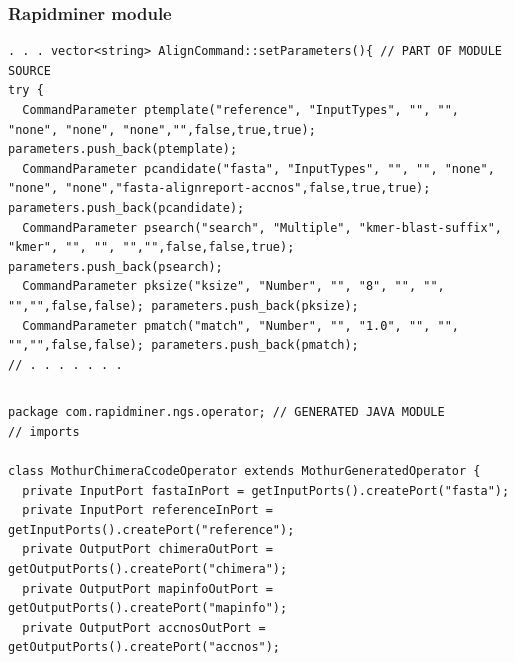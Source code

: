 \documentclass[10pt]{beamer}
\begin{document}
\begin{frame}[fragile]
  \frametitle{Rapidminer module}
\begin{verbatim}
. . . vector<string> AlignCommand::setParameters(){ // PART OF MODULE SOURCE
try {
  CommandParameter ptemplate("reference", "InputTypes", "", "", "none", "none", "none","",false,true,true); parameters.push_back(ptemplate);
  CommandParameter pcandidate("fasta", "InputTypes", "", "", "none", "none", "none","fasta-alignreport-accnos",false,true,true); parameters.push_back(pcandidate);
  CommandParameter psearch("search", "Multiple", "kmer-blast-suffix", "kmer", "", "", "","",false,false,true); parameters.push_back(psearch);
  CommandParameter pksize("ksize", "Number", "", "8", "", "", "","",false,false); parameters.push_back(pksize);
  CommandParameter pmatch("match", "Number", "", "1.0", "", "", "","",false,false); parameters.push_back(pmatch);
// . . . . . . .
\end{verbatim}
  \begin{columns}
    \begin{column}{0.6\linewidth}
\begin{verbatim}
package com.rapidminer.ngs.operator; // GENERATED JAVA MODULE
// imports

class MothurChimeraCcodeOperator extends MothurGeneratedOperator {
  private InputPort fastaInPort = getInputPorts().createPort("fasta");
  private InputPort referenceInPort = getInputPorts().createPort("reference");
  private OutputPort chimeraOutPort = getOutputPorts().createPort("chimera");
  private OutputPort mapinfoOutPort = getOutputPorts().createPort("mapinfo");
  private OutputPort accnosOutPort = getOutputPorts().createPort("accnos");


\end{verbatim}
\end{column}
\end{columns}
\end{frame}
\end{document}
